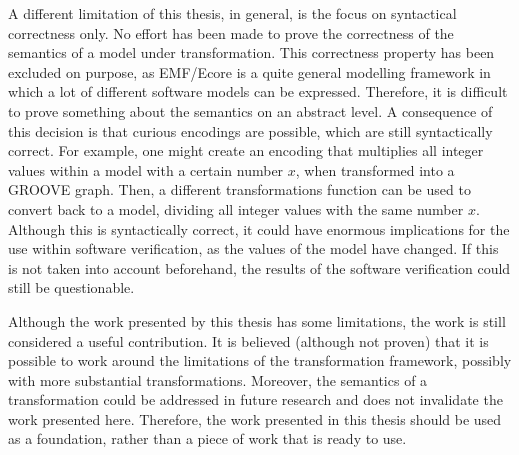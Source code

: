A different limitation of this thesis, in general, is the focus on syntactical correctness only. No effort has been made to prove the correctness of the semantics of a model under transformation. This correctness property has been excluded on purpose, as EMF/Ecore is a quite general modelling framework in which a lot of different software models can be expressed. Therefore, it is difficult to prove something about the semantics on an abstract level. A consequence of this decision is that curious encodings are possible, which are still syntactically correct. For example, one might create an encoding that multiplies all integer values within a model with a certain number $x$, when transformed into a GROOVE graph. Then, a different transformations function can be used to convert back to a model, dividing all integer values with the same number $x$. Although this is syntactically correct, it could have enormous implications for the use within software verification, as the values of the model have changed. If this is not taken into account beforehand, the results of the software verification could still be questionable.

Although the work presented by this thesis has some limitations, the work is still considered a useful contribution. It is believed (although not proven) that it is possible to work around the limitations of the transformation framework, possibly with more substantial transformations. Moreover, the semantics of a transformation could be addressed in future research and does not invalidate the work presented here. Therefore, the work presented in this thesis should be used as a foundation, rather than a piece of work that is ready to use.
